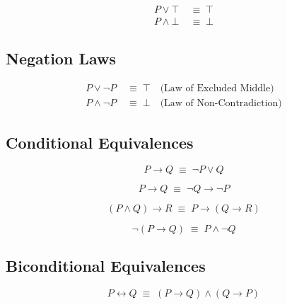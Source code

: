 \begin{theorem}
\begin{align*}
P \vee \top &\;\equiv\; \top \\
P \wedge \bot &\;\equiv\; \bot
\end{align*}
\end{theorem}

\subsection{Negation Laws}

\begin{theorem}
\begin{align*}
P \vee \neg P &\;\equiv\; \top \quad \text{(Law of Excluded Middle)} \\
P \wedge \neg P &\;\equiv\; \bot \quad \text{(Law of Non-Contradiction)}
\end{align*}
\end{theorem}

\subsection{Conditional Equivalences}

\begin{theorem}
\[
P \rightarrow Q \;\equiv\; \neg P \vee Q
\]
\end{theorem}

\begin{theorem}[Contraposition]
\[
P \rightarrow Q \;\equiv\; \neg Q \rightarrow \neg P
\]
\end{theorem}

\begin{theorem}
\[
(P \wedge Q) \rightarrow R \;\equiv\; P \rightarrow (Q \rightarrow R)
\]
\end{theorem}

\begin{theorem}
\[
\neg(P \rightarrow Q) \;\equiv\; P \wedge \neg Q
\]
\end{theorem}

\subsection{Biconditional Equivalences}

\begin{theorem}
\[
P \leftrightarrow Q \;\equiv\; (P \rightarrow Q) \wedge (Q \rightarrow P)
\]
\end{theorem}


